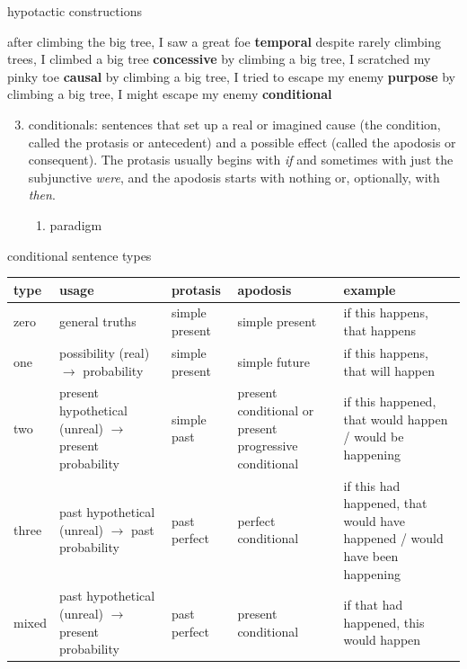 \documentclass[12pt]{article}
\begin{document}
\begin{exe}
\ex hypotactic constructions
    \begin{xlist}
    \ex after climbing the big tree, I saw a great foe \hfill \textbf{temporal}
    \ex despite rarely climbing trees, I climbed a big tree \hfill \textbf{concessive}
    \ex by climbing a big tree, I scratched my pinky toe \hfill \textbf{causal}
    \ex by climbing a big tree, I tried to escape my enemy \hfill \textbf{purpose}
    \ex by climbing a big tree, I might escape my enemy \hfill \textbf{conditional}
    \end{xlist}
\end{exe}
\begin{enumerate}
\setcounter{enumi}{2}
\item conditionals: sentences that set up a real or imagined cause (the condition, called the protasis or antecedent) and a possible effect (called the apodosis or consequent). The protasis usually begins with \textit{if} and sometimes with just the subjunctive \textit{were}, and the apodosis starts with nothing or, optionally, with \textit{then}.
    \begin{enumerate}
    \item paradigm
    \end{enumerate}
\end{enumerate}

\begin{exe}
\ex conditional sentence types
\end{exe}

\begin{center}
\begin{tabularx}{\textwidth}{
| >{\centering\arraybackslash}X
| >{\centering\arraybackslash}X
| >{\centering\arraybackslash}X
| >{\centering\arraybackslash}X
| >{\centering\arraybackslash}X
|
}
\hline
type & usage & protasis & apodosis & example \\
\hline \hline
zero & general truths & simple present & simple present & if this happens, that happens \\
\hline
one & possibility (real) $\rightarrow$ probability & simple present & simple future & if this happens, that will happen\\
\hline
two & present hypothetical (unreal) $\rightarrow$ present probability & simple past & present conditional or present progressive conditional & if this happened, that would happen / would be happening \\
\hline
three & past hypothetical (unreal) $\rightarrow$ past probability & past perfect & perfect conditional & if this had happened, that would have happened / would have been happening \\
\hline
mixed & past hypothetical (unreal) $\rightarrow$ present probability & past perfect & present conditional & if that had happened, this would happen \\
\hline
\end{tabularx}
\end{center}
\end{document}
